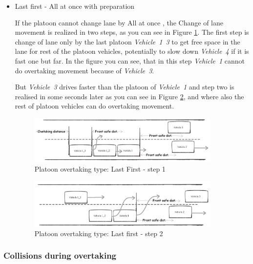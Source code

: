 \begin{itemize}
\item Last first - All at once with preparation

If the platoon cannot change lane by All at once , the Change of lane movement is realized in two steps, as you can see in Figure \ref{fig:4_2_3_3-10}. The first step is change of lane only by the last platoon \textit{\mbox{Vehicle 1 3}} to get free space in the lane for rest of the platoon vehicles, potentially to slow down \textit{\mbox{Vehicle 4}} if it is fast one but far. In the figure you can see, that in this step \textit{\mbox{\mbox{Vehicle 1}}} cannot do overtaking movement because of \textit{\mbox{Vehicle 3}}. 

But \textit{\mbox{Vehicle 3}} drives faster than the platoon of \textit{\textit{\mbox{\mbox{Vehicle 1}}}} and step two is realised in some seconds later as you can see in Figure \ref{fig:4_2_3_3-11}, and where also the rest of platoon vehicles can do overtaking movement.

\begin{figure}[ph]
\centering
\includegraphics[width=0.90\textwidth,height=0.90\textheight,keepaspectratio]{figures/Chapter_4/4_overtaking_lastFirst1.png}
\centering
\protect\caption{\label{fig:4_2_3_3-10}Platoon overtaking type: Last First - step 1}
\end{figure}


\begin{figure}[ph]
\centering
\includegraphics[width=0.90\textwidth,height=0.90\textheight,keepaspectratio]{figures/Chapter_4/4_overtaking_lastFirst2.png}
\centering
\protect\caption{\label{fig:4_2_3_3-11}Platoon overtaking type: Last first - step 2}
\end{figure}


\end{itemize}

\subsubsection*{Collisions during overtaking}

